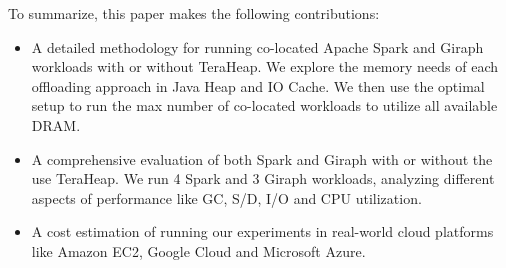 To summarize, this paper makes the following contributions: 
\begin{itemize}
    \item{A detailed methodology for running co-located Apache Spark and Giraph
        workloads with or without TeraHeap.
	We explore the memory needs of each offloading approach in Java Heap and IO Cache. We then use 
	the optimal setup to run the max number of co-located workloads to utilize all available DRAM.}

    \item{A comprehensive evaluation of both Spark and Giraph with or without the use TeraHeap.
	    We run 4 Spark and 3 Giraph workloads,
	    analyzing different aspects of performance like GC, S/D, I/O
		and CPU utilization.}

    \item{A cost estimation of running our experiments in real-world
        cloud platforms like Amazon EC2, Google Cloud and Microsoft
        Azure.}
\end{itemize}
